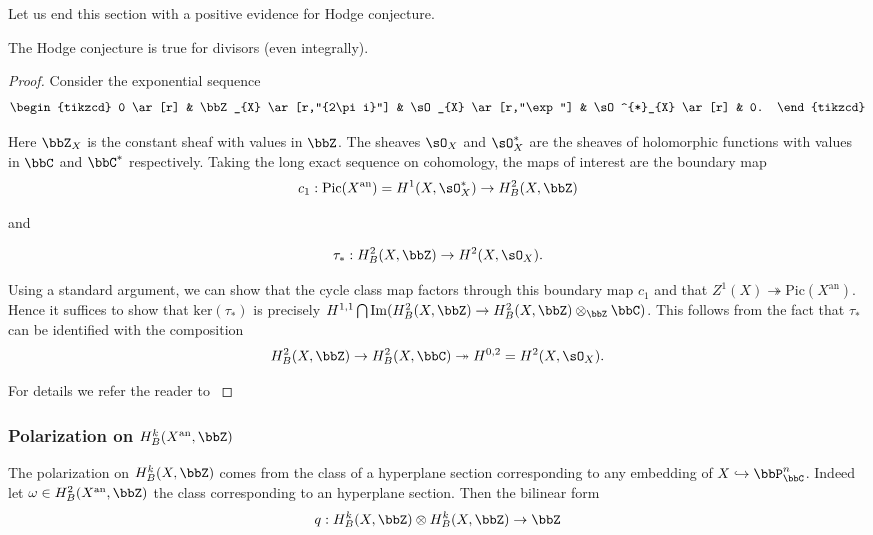 \documentclass[a4paper,12pt]{book}
\begin{document}
Let us end this section with a positive evidence for Hodge conjecture.

\begin{prop}
\label{prop:hodge-conjecture-divisors}
The Hodge conjecture is true for divisors (even integrally).
\end{prop}

\begin{proof}
Consider the exponential sequence
\[
\begin{tikzcd}
0 \ar[r] & \bbZ_{X} \ar[r,"{2\pi i}"] & \sO_{X} \ar[r,"\exp"] & \sO^{*}_{X} \ar[r] & 0.
\end{tikzcd}
\]

Here $\bbZ_{X}$ is the constant sheaf with values in $\bbZ$. The sheaves $\sO_{X}$ and $\sO_{X}^{*}$ are the sheaves of holomorphic functions with values in $\bbC$ and $\bbC^{*}$ respectively. Taking the long exact sequence on cohomology, the maps of interest are the boundary map 
\[
c_{1}: \mathrm{Pic}(X^{\mathrm{an}})=H^{1}(X,\sO_{X}^{*}) \to H^{2}_{B}(X,\bbZ)
\]

\noindent and

\[
\tau_{*}: H^{2}_{B}(X,\bbZ) \to H^{2}(X,\sO_{X}).
\]

Using a standard argument, we can show that the cycle class map factors through this boundary map $c_{1}$ and that $Z^{1}(X) \twoheadrightarrow \text{Pic}(X^{\mathrm{an}})$. Hence it suffices to show that $\text{ker}(\tau_{*})$ is precisely $H^{1,1}\bigcap\mathrm{Im}(H^{2}_{B}(X,\bbZ) \to H^{2}_{B}(X,\bbZ)\otimes_{\bbZ}\bbC)$. This follows from the fact that $\tau_{*}$ can be identified with the composition 
\[
H^{2}_{B}(X,\bbZ) \to H^{2}_{B}(X,\bbC) \twoheadrightarrow H^{0,2}=H^{2}(X,\sO_{X}).
\]

For details we refer the reader to \cite[Pg 163]{GriffithsHarris}
\end{proof}


\subsubsection{Polarization on $H^k_B(X^\mathrm{an},\bbZ)$}
\label{sec:polarization-equip}

The polarization on $H^{k}_{B}(X,\bbZ)$ comes from the class of a hyperplane section corresponding to any embedding of $X \hookrightarrow \bbP^{n}_{\bbC}$. Indeed let $\omega \in H_{B}^{2}(X^{\mathrm{an}},\bbZ)$ the class corresponding to an hyperplane section. Then the bilinear form 
\[
q : H^{k}_{B}(X,\bbZ) \otimes H^{k}_{B}(X,\bbZ) \to \bbZ
\] 
\end{document}
